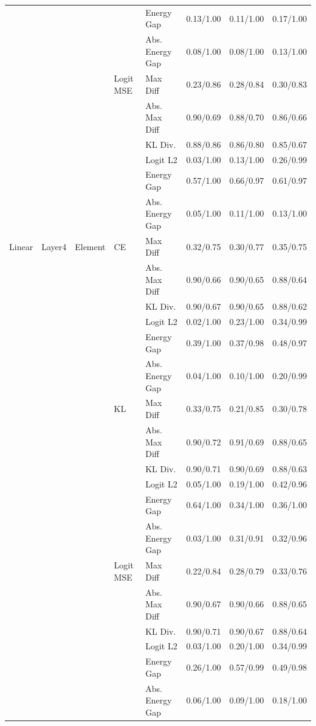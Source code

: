 \documentclass[border=2pt]{standalone}
\begin{document}
\begin{tabular}{lllllccc}
 &  &  &  & Energy Gap & 0.13/1.00 & 0.11/1.00 & 0.17/1.00 \\
 &  &  &  & Abs. Energy Gap & 0.08/1.00 & 0.08/1.00 & 0.13/1.00 \\
\addlinespace
 &  &  & Logit MSE & Max Diff & 0.23/0.86 & 0.28/0.84 & 0.30/0.83 \\
 &  &  &  & Abs. Max Diff & 0.90/0.69 & 0.88/0.70 & 0.86/0.66 \\
 &  &  &  & KL Div. & 0.88/0.86 & 0.86/0.80 & 0.85/0.67 \\
 &  &  &  & Logit L2 & 0.03/1.00 & 0.13/1.00 & 0.26/0.99 \\
 &  &  &  & Energy Gap & 0.57/1.00 & 0.66/0.97 & 0.61/0.97 \\
 &  &  &  & Abs. Energy Gap & 0.05/1.00 & 0.11/1.00 & 0.13/1.00 \\
\midrule
Linear & Layer4 & Element & CE & Max Diff & 0.32/0.75 & 0.30/0.77 & 0.35/0.75 \\
 &  &  &  & Abs. Max Diff & 0.90/0.66 & 0.90/0.65 & 0.88/0.64 \\
 &  &  &  & KL Div. & 0.90/0.67 & 0.90/0.65 & 0.88/0.62 \\
 &  &  &  & Logit L2 & 0.02/1.00 & 0.23/1.00 & 0.34/0.99 \\
 &  &  &  & Energy Gap & 0.39/1.00 & 0.37/0.98 & 0.48/0.97 \\
 &  &  &  & Abs. Energy Gap & 0.04/1.00 & 0.10/1.00 & 0.20/0.99 \\
\addlinespace
 &  &  & KL & Max Diff & 0.33/0.75 & 0.21/0.85 & 0.30/0.78 \\
 &  &  &  & Abs. Max Diff & 0.90/0.72 & 0.91/0.69 & 0.88/0.65 \\
 &  &  &  & KL Div. & 0.90/0.71 & 0.90/0.69 & 0.88/0.63 \\
 &  &  &  & Logit L2 & 0.05/1.00 & 0.19/1.00 & 0.42/0.96 \\
 &  &  &  & Energy Gap & 0.64/1.00 & 0.34/1.00 & 0.36/1.00 \\
 &  &  &  & Abs. Energy Gap & 0.03/1.00 & 0.31/0.91 & 0.32/0.96 \\
\addlinespace
 &  &  & Logit MSE & Max Diff & 0.22/0.84 & 0.28/0.79 & 0.33/0.76 \\
 &  &  &  & Abs. Max Diff & 0.90/0.67 & 0.90/0.66 & 0.88/0.65 \\
 &  &  &  & KL Div. & 0.90/0.71 & 0.90/0.67 & 0.88/0.64 \\
 &  &  &  & Logit L2 & 0.03/1.00 & 0.20/1.00 & 0.34/0.99 \\
 &  &  &  & Energy Gap & 0.26/1.00 & 0.57/0.99 & 0.49/0.98 \\
 &  &  &  & Abs. Energy Gap & 0.06/1.00 & 0.09/1.00 & 0.18/1.00 \\
\bottomrule
\end{tabular}
\end{document}
